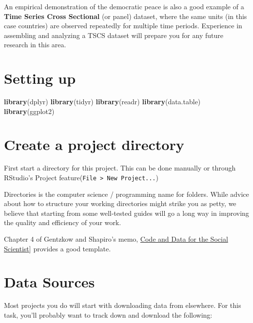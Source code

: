 \documentclass[]{book}
\newenvironment{Shaded}{\begin{snugshade}}{\end{snugshade}}
\newcommand{\KeywordTok}[1]{\textcolor[rgb]{0.13,0.29,0.53}{\textbf{#1}}}
\newcommand{\NormalTok}[1]{#1}
\theoremstyle{definition}
\theoremstyle{definition}
\theoremstyle{definition}
\theoremstyle{remark}
\begin{document}
An empirical demonstration of the democratic peace is also a good
example of a \textbf{Time Series Cross Sectional} (or panel) dataset,
where the same units (in this case countries) are observed repeatedly
for multiple time periods. Experience in assembling and analyzing a TSCS
dataset will prepare you for any future research in this area.

\section{Setting up}\label{setting-up}

\begin{Shaded}
\begin{Highlighting}[]
\KeywordTok{library}\NormalTok{(dplyr)}
\KeywordTok{library}\NormalTok{(tidyr)}
\KeywordTok{library}\NormalTok{(readr)}
\KeywordTok{library}\NormalTok{(data.table)}
\KeywordTok{library}\NormalTok{(ggplot2)}
\end{Highlighting}
\end{Shaded}

\section{Create a project directory}\label{create-a-project-directory}

First start a directory for this project. This can be done manually or
through RStudio's Project
feature(\texttt{File\ \textgreater{}\ New\ Project...})

Directories is the computer science / programming name for folders.
While advice about how to structure your working directories might
strike you as petty, we believe that starting from some well-tested
guides will go a long way in improving the quality and efficiency of
your work.

Chapter 4 of Gentzkow and Shapiro's memo,
\href{https://web.stanford.edu/~gentzkow/research/CodeAndData.pdf}{Code
and Data for the Social Scientist}{]} provides a good template.

\section{Data Sources}\label{data-sources}

Most projects you do will start with downloading data from elsewhere.
For this task, you'll probably want to track down and download the
following:
\end{document}
